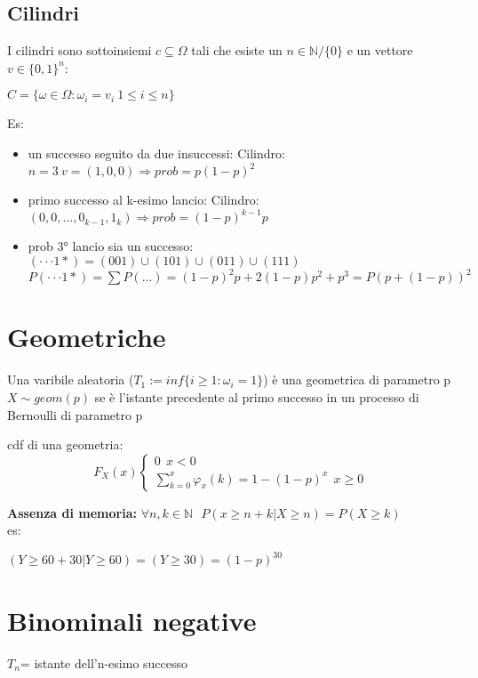 \documentclass[12pt, a4paper]{article}
\begin{document}
\subsection{Cilindri}
I cilindri sono sottoinsiemi $c\subseteq\Omega$ tali che esiste un $n\in\mathbb{N}/\{0\}$ e un vettore $v\in\{0,1\}^{n}$:
\begin{center}
    $C=\{\omega\in\Omega :\omega_{i}=v_{i}\ 1\leq i\leq n\}$
\end{center}
Es:
\begin{itemize}
    \item un successo seguito da due insuccessi:
    \subitem Cilindro: $n=3\ v=(1,0,0)\Rightarrow prob=p(1-p)^{2}$
    \item primo successo al k-esimo lancio:
    \subitem Cilindro: $(0,0,...,0_{k-1},1_{k})\Rightarrow prob=(1-p)^{k-1}p$
    \item prob 3° lancio sia un successo:
    \subitem $(\cdot\cdot\cdot 1*)=(001)\cup(101)\cup(011)\cup(111)$
    \subitem $P(\cdot\cdot\cdot 1*)=\sum P(...)=(1-p)^{2}p+2(1-p)p^{2}+p^{3}=P(p+(1-p))^{2}$ 
\end{itemize}

\section{Geometriche}
Una varibile aleatoria ($T_{1}:=inf\{i\geq 1: \omega_{i}=1\}$) è una geometrica di parametro p $X\sim geom(p)$
se è l'istante precedente al primo successo in un processo di Bernoulli di parametro p

cdf di una geometria:
\begin{equation}
    F_{X}(x)
  \begin{cases}
    0\ \ x<0\\
    \sum_{k=0}^{x} \varphi_{x}(k)=1-(1-p)^{x}\ \ x \geq 0
  \end{cases}
\end{equation}

\textbf{Assenza di memoria:} $\forall n,k\in\mathbb{N}\ \ \ P(x\geq n+k|X\geq n)=P(X\geq k)$\\
es:
\begin{center}
    $(Y\geq 60+30|Y\geq 60)=(Y\geq 30)=(1-p)^{30}$
\end{center}

\section{Binominali negative}
$T_{n}$= istante dell'n-esimo successo
\end{document}
